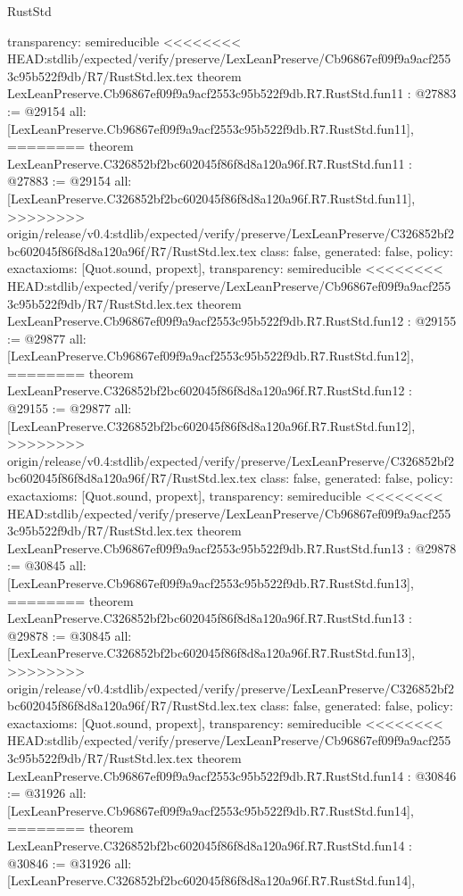 \begin{lexlean}{RustStd}
\begin{coremodule}
{\begin{coremodule}
{{{{{{{{{{{{{{  transparency: semireducible
}
<<<<<<<< HEAD:stdlib/expected/verify/preserve/LexLeanPreserve/Cb96867ef09f9a9acf2553c95b522f9db/R7/RustStd.lex.tex
theorem LexLeanPreserve.Cb96867ef09f9a9acf2553c95b522f9db.R7.RustStd.fun11 : @27883 := @29154 {
  all: [LexLeanPreserve.Cb96867ef09f9a9acf2553c95b522f9db.R7.RustStd.fun11],
========
theorem LexLeanPreserve.C326852bf2bc602045f86f8d8a120a96f.R7.RustStd.fun11 : @27883 := @29154 {
  all: [LexLeanPreserve.C326852bf2bc602045f86f8d8a120a96f.R7.RustStd.fun11],
>>>>>>>> origin/release/v0.4:stdlib/expected/verify/preserve/LexLeanPreserve/C326852bf2bc602045f86f8d8a120a96f/R7/RustStd.lex.tex
  class: false,
  generated: false,
  policy: exact{axioms: [Quot.sound, propext]},
  transparency: semireducible
}
<<<<<<<< HEAD:stdlib/expected/verify/preserve/LexLeanPreserve/Cb96867ef09f9a9acf2553c95b522f9db/R7/RustStd.lex.tex
theorem LexLeanPreserve.Cb96867ef09f9a9acf2553c95b522f9db.R7.RustStd.fun12 : @29155 := @29877 {
  all: [LexLeanPreserve.Cb96867ef09f9a9acf2553c95b522f9db.R7.RustStd.fun12],
========
theorem LexLeanPreserve.C326852bf2bc602045f86f8d8a120a96f.R7.RustStd.fun12 : @29155 := @29877 {
  all: [LexLeanPreserve.C326852bf2bc602045f86f8d8a120a96f.R7.RustStd.fun12],
>>>>>>>> origin/release/v0.4:stdlib/expected/verify/preserve/LexLeanPreserve/C326852bf2bc602045f86f8d8a120a96f/R7/RustStd.lex.tex
  class: false,
  generated: false,
  policy: exact{axioms: [Quot.sound, propext]},
  transparency: semireducible
}
<<<<<<<< HEAD:stdlib/expected/verify/preserve/LexLeanPreserve/Cb96867ef09f9a9acf2553c95b522f9db/R7/RustStd.lex.tex
theorem LexLeanPreserve.Cb96867ef09f9a9acf2553c95b522f9db.R7.RustStd.fun13 : @29878 := @30845 {
  all: [LexLeanPreserve.Cb96867ef09f9a9acf2553c95b522f9db.R7.RustStd.fun13],
========
theorem LexLeanPreserve.C326852bf2bc602045f86f8d8a120a96f.R7.RustStd.fun13 : @29878 := @30845 {
  all: [LexLeanPreserve.C326852bf2bc602045f86f8d8a120a96f.R7.RustStd.fun13],
>>>>>>>> origin/release/v0.4:stdlib/expected/verify/preserve/LexLeanPreserve/C326852bf2bc602045f86f8d8a120a96f/R7/RustStd.lex.tex
  class: false,
  generated: false,
  policy: exact{axioms: [Quot.sound, propext]},
  transparency: semireducible
}
<<<<<<<< HEAD:stdlib/expected/verify/preserve/LexLeanPreserve/Cb96867ef09f9a9acf2553c95b522f9db/R7/RustStd.lex.tex
theorem LexLeanPreserve.Cb96867ef09f9a9acf2553c95b522f9db.R7.RustStd.fun14 : @30846 := @31926 {
  all: [LexLeanPreserve.Cb96867ef09f9a9acf2553c95b522f9db.R7.RustStd.fun14],
========
theorem LexLeanPreserve.C326852bf2bc602045f86f8d8a120a96f.R7.RustStd.fun14 : @30846 := @31926 {
  all: [LexLeanPreserve.C326852bf2bc602045f86f8d8a120a96f.R7.RustStd.fun14],
}}}}}}}}}}}}}}}}}}
\end{coremodule}}
\end{coremodule}
\end{lexlean}
